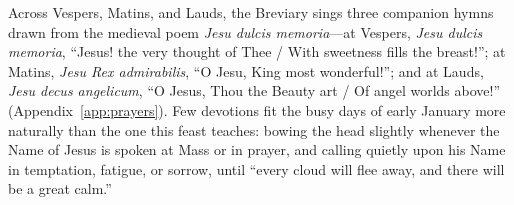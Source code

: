 Across Vespers, Matins, and Lauds, the Breviary sings three companion hymns
drawn from the medieval poem \textit{Jesu dulcis memoria}---at Vespers,
\textit{Jesu dulcis memoria}, ``Jesus! the very thought of Thee / With
sweetness fills the breast!''; at Matins, \textit{Jesu Rex admirabilis}, ``O
Jesu, King most wonderful!''; and at Lauds, \textit{Jesu decus angelicum}, ``O
Jesus, Thou the Beauty art / Of angel worlds above!'' (Appendix~\ref{app:prayers}).
Few devotions fit the busy days of early January more naturally than the one
this feast teaches: bowing the head slightly whenever the Name of Jesus is
spoken at Mass or in prayer, and calling quietly upon his Name in temptation,
fatigue, or sorrow, until ``every cloud will flee away, and there will be a
great calm.''
